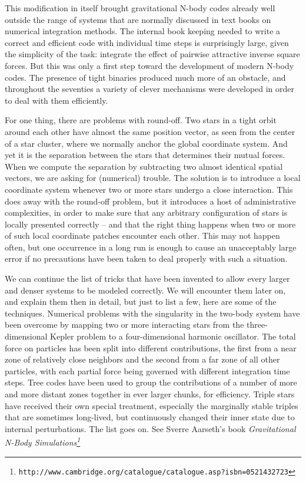 \documentclass{book}
\begin{document}
This modification in itself brought gravitational N-body codes already
well outside the range of systems that are normally discussed in text
books on numerical integration methods.  The internal book keeping
needed to write a correct and efficient code with individual time
steps is surprisingly large, given the simplicity of the task:
integrate the effect of pairwise attractive inverse square forces.
But this was only a first step toward the development of modern N-body
codes.  The presence of tight binaries produced much more of an obstacle,
and throughout the seventies a variety of clever mechanisms were developed
in order to deal with them efficiently.

For one thing, there are problems with round-off.  Two stars in a
tight orbit around each other have almost the same position vector, as
seen from the center of a star cluster, where we normally anchor the
global coordinate system.  And yet it is the separation between the
stars that determines their mutual forces.  When we compute the
separation by subtracting two almost identical spatial vectors, we are
asking for (numerical) trouble.  The solution is to introduce a local
coordinate system whenever two or more stars undergo a close
interaction.  This does away with the round-off problem, but it
introduces a host of administrative complexities, in order to make
sure that any arbitrary configuration of stars is locally presented
correctly -- and that the right thing happens when two or more of such
local coordinate patches encounter each other.  This may not happen
often, but one occurrence in a long run is enough to cause an
unacceptably large error if no precautions have been taken to deal
properly with such a situation.

We can continue the list of tricks that have been invented to allow
every larger and denser systems to be modeled correctly.  We will
encounter them later on, and explain them then in detail, but just to
list a few, here are some of the techniques.  Numerical problems with
the singularity in the two-body system have been overcome by mapping
two or more interacting stars from the three-dimensional Kepler
problem to a four-dimensional harmonic oscillator.  The total force on
particles has been split into different contributions, the first from
a near zone of relatively close neighbors and the second from a far
zone of all other particles, with each partial force being governed
with different integration time steps.  Tree codes have been used to
group the contributions of a number of more and more distant zones
together in ever larger chunks, for efficiency.  Triple stars have
received their own special treatment, especially the marginally stable
triples that are sometimes long-lived, but continuously changed their
inner state due to internal perturbations.  The list goes on.  See
Sverre Aarseth's book
 {\it Gravitational
N-Body Simulations\footnote{\tt http://www.cambridge.org/catalogue/catalogue.asp?isbn=0521432723}}
\end{document}
